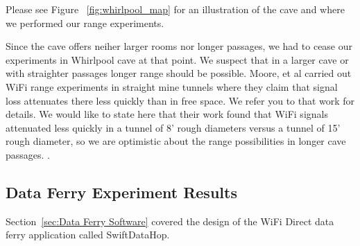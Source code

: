 \documentclass[10pt,twocolumn]{article}
\begin{document}
Please see Figure ~\ref{fig:whirlpool_map} for an illustration of the cave and where we performed our range experiments.

Since the cave offers neiher larger rooms nor longer passages, we had to cease our experiments in Whirlpool cave at that point.
We suspect that in a larger cave or with straighter passages longer range should be possible.
Moore, et al carried out WiFi range experiments in straight mine tunnels where they claim that signal loss attenuates there less quickly than in free space.
We refer you to that work for details.
We would like to state here that their work found that WiFi signals attenuated less quickly in a tunnel of 8' rough diameters versus a tunnel of 15' rough diameter, so we are optimistic about the range possibilities in longer cave passages. \cite{moore2012}.

\subsection{Data Ferry Experiment Results}
\label{sec:Data Ferry Experiment Results}
Section~\ref{sec:Data Ferry Software} covered the design of the WiFi Direct data ferry application called SwiftDataHop. 
\end{document}

